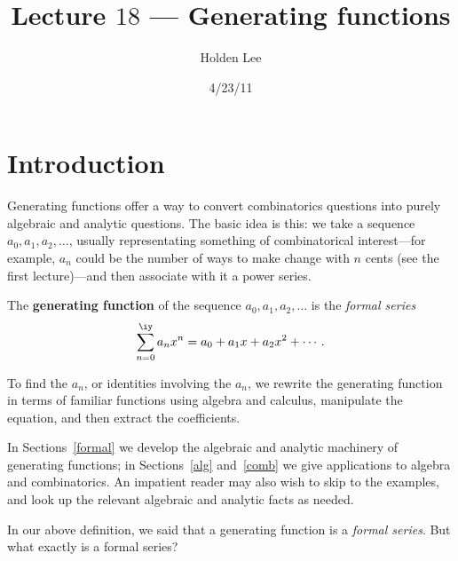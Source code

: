 
\pagestyle{fancy}





%
%

\title{Lecture $18$ --- Generating functions}%
\author{Holden Lee}
\date{4/23/11}%
\maketitle
\thispagestyle{empty}
\section{Introduction}\label{intro}
Generating functions offer a way to convert combinatorics questions into purely algebraic and analytic questions. The basic idea is this: we take a sequence $a_0,a_1,a_2,\ldots $, usually representating something of combinatorical interest---for example, $a_n$ could be the number of ways to make change with $n$ cents (see the first lecture)---and then associate with it a power series.
\begin{df}
The \textbf{generating function} of the sequence $a_0,a_1,a_2,\ldots$ is the {\it formal series}
\[
\sum_{n=0}^{\iy} a_nx^n=a_0+a_1x+a_2x^2+\cdots.
\]
\end{df}
To find the $a_n$, or identities involving the $a_n$, we rewrite the generating function in terms of familiar functions using algebra and calculus, manipulate the equation, and then extract the coefficients.

In Sections~\ref{formal} we develop the algebraic and analytic machinery of generating functions; in Sections~\ref{alg} and~\ref{comb} we give applications to algebra and combinatorics. %
An impatient reader may also wish to skip to the examples, and look up the relevant algebraic and analytic facts as needed.

In our above definition, we said that a generating function is a {\it formal series}. But what exactly is a formal series?
